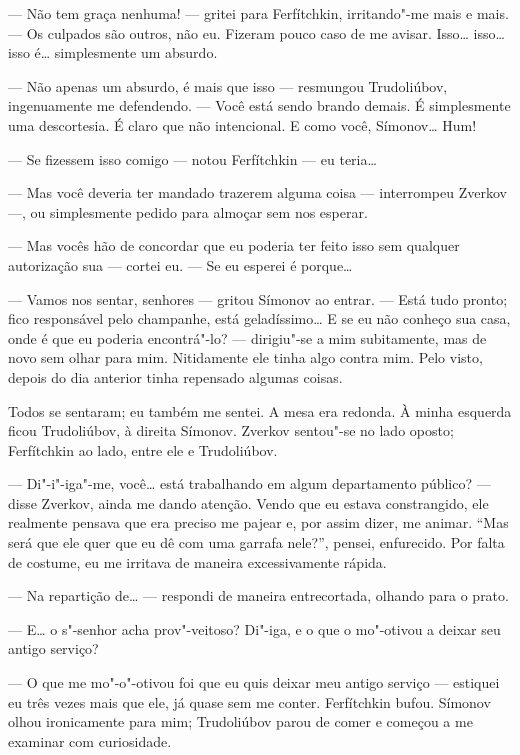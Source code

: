 --- Não tem graça nenhuma! --- gritei para Ferfítchkin, irritando"-me mais e
mais. --- Os culpados são outros, não eu. Fizeram pouco caso de me
avisar. Isso\ldots{} isso\ldots{} isso é\ldots{} simplesmente um absurdo.

--- Não apenas um absurdo, é mais que isso --- resmungou Trudoliúbov,
ingenuamente me defendendo. --- Você está sendo brando demais. É
simplesmente uma descortesia. É claro que não intencional. E como você,
Símonov\ldots{} Hum!

--- Se fizessem isso comigo --- notou Ferfítchkin --- eu teria\ldots{}

--- Mas você deveria ter mandado trazerem alguma coisa --- interrompeu
Zverkov ---, ou simplesmente pedido para almoçar sem nos esperar.

--- Mas vocês hão de concordar que eu poderia ter feito isso sem qualquer
autorização sua --- cortei eu. --- Se eu esperei é porque\ldots{}

--- Vamos nos sentar, senhores --- gritou Símonov ao entrar. --- Está tudo
pronto; fico responsável pelo champanhe, está geladíssimo\ldots{} E se eu
não conheço sua casa, onde é que eu poderia encontrá"-lo? --- dirigiu"-se
a mim subitamente, mas de novo sem olhar para mim. Nitidamente ele
tinha algo contra mim. Pelo visto, depois do dia anterior tinha
repensado algumas coisas.

Todos se sentaram; eu também me sentei. A mesa era redonda. À minha
esquerda ficou Trudoliúbov, à direita Símonov. Zverkov sentou"-se no
lado oposto; Ferfítchkin ao lado, entre ele e Trudoliúbov.

--- Di"-i"-iga"-me, você\ldots{} está trabalhando em algum departamento público? ---
disse Zverkov, ainda me dando atenção. Vendo que eu estava
constrangido, ele realmente pensava que era preciso me pajear e, por
assim dizer, me animar. “Mas será que ele quer que eu dê com uma
garrafa nele?”, pensei, enfurecido. Por falta de costume, eu me
irritava de maneira excessivamente rápida.

--- Na repartição de\ldots{} --- respondi de maneira entrecortada, olhando para o
prato.

--- E\ldots{} o s"-senhor acha prov"-veitoso? Di"-iga, e o que o mo"-otivou a
deixar seu antigo serviço?

--- O que me mo"-o"-otivou foi que eu quis deixar meu antigo serviço ---
estiquei eu três vezes mais que ele, já quase sem me conter.
Ferfítchkin bufou. Símonov olhou ironicamente para mim; Trudoliúbov
parou de comer e começou a me examinar com curiosidade.

